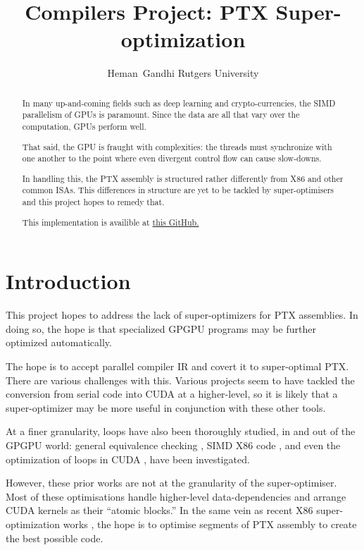 \documentclass[letterpaper,twocolumn,10pt]{article}
\title{\Large \bf Compilers Project: PTX Super-optimization}
\date{}
\author{\rm{Heman\ Gandhi} Rutgers University}
\begin{document}


\maketitle

\begin{abstract}
In many up-and-coming fields such as deep learning and
crypto-currencies, the SIMD parallelism of GPUs is paramount.
Since the data are all that vary over the computation, GPUs
perform well.

That said, the GPU is fraught with complexities:
the threads must synchronize with one another to the
point where even divergent control flow can cause
slow-downs.

In handling this, the PTX assembly is structured rather
differently from X86 and other common ISAs. This differences
in structure are yet to be tackled by super-optimisers and
this project hopes to remedy that.

This implementation is availible at \href{https://github.com/hemangandhi/ptx-superoptimize}{this GitHub.}
\end{abstract}

\section{Introduction}

This project hopes to address the lack of super-optimizers for
PTX assemblies. In doing so, the hope is that specialized GPGPU
programs may be further optimized automatically.

The hope is to accept parallel compiler IR and
covert it to super-optimal PTX. There are various challenges with
this. Various projects
seem to have tackled the conversion from serial code into CUDA at
a higher-level, so it is likely that a super-optimizer may be more
useful in conjunction with these other tools. \cite{hicuda} \cite{CUDASynth}

At a finer granularity, loops have also been thoroughly studied,
in and out of the GPGPU world: general equivalence checking \cite{DataEquiv},
SIMD X86 code \cite{SIMDSynth}, and even the optimization of loops in CUDA
\cite{CUDALoops}, have been investigated.

However, these prior works are not at the granularity of the super-optimiser.
Most of these optimisations handle higher-level data-dependencies and arrange
CUDA kernels as their ``atomic blocks.'' In the same vein as recent X86
super-optimization works \cite{superopt}, the hope is to optimise segments
of PTX assembly to create the best possible code.
\end{document}
